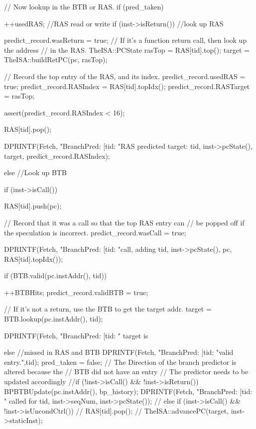 \begin{DoxyCode}
{    // Now lookup in the BTB or RAS.
    if (pred_taken)
    {
        ++usedRAS; //RAS read or write
        if (inst->isReturn()) //look up RAS
        {
            predict_record.wasReturn = true;
            // If it's a function return call, then look up the address
            // in the RAS.
            TheISA::PCState rasTop = RAS[tid].top();
            target = TheISA::buildRetPC(pc, rasTop);

            // Record the top entry of the RAS, and its index.
            predict_record.usedRAS = true;
            predict_record.RASIndex = RAS[tid].topIdx();
            predict_record.RASTarget = rasTop;

            assert(predict_record.RASIndex < 16);

            RAS[tid].pop();

            DPRINTF(Fetch, "BranchPred: [tid:%
                    "RAS predicted target: %
                    tid, inst->pcState(), target, predict_record.RASIndex);
        }
        else //Look up BTB
        {
            if (inst->isCall()) {
                RAS[tid].push(pc);

                // Record that it was a call so that the top RAS entry can
                // be popped off if the speculation is incorrect.
                predict_record.wasCall = true;

                DPRINTF(Fetch, "BranchPred: [tid:%
                        "call, adding %
                        tid, inst->pcState(), pc, RAS[tid].topIdx());
            }

            if (BTB.valid(pc.instAddr(), tid)) {
                ++BTBHits;
                predict_record.validBTB = true;

                // If it's not a return, use the BTB to get the target addr.
                target = BTB.lookup(pc.instAddr(), tid);

                DPRINTF(Fetch, "BranchPred: [tid:%
                        " target is %

            } else { //missed in RAS and BTB
                DPRINTF(Fetch, "BranchPred: [tid:%
                        "valid entry.\n",tid);
                pred_taken = false;
                // The Direction of the branch predictor is altered because the
                // BTB did not have an entry
                // The predictor needs to be updated accordingly
              //if (!inst->isCall() && !inst->isReturn()) {
                      BPBTBUpdate(pc.instAddr(), bp_history);
                      DPRINTF(Fetch, "BranchPred: [tid:%
                              " called for %
                              tid, inst->seqNum, inst->pcState());
              //} else if (inst->isCall() && !inst->isUncondCtrl()) {
              //      RAS[tid].pop();
              //}
                TheISA::advancePC(target, inst->staticInst);
            }

}}}
\end{DoxyCode}
